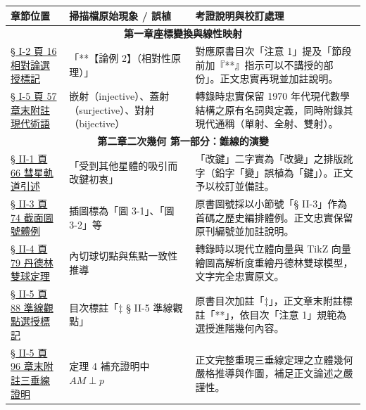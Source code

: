 \documentclass[a4paper,12pt,twoside]{article}
\begin{document}
\begin{table}[H]
\centering
\small
\renewcommand{\arraystretch}{1.35}
\begin{tabularx}{\textwidth}{|p{3.0cm}|p{3.8cm}|X|}
\hline
\textbf{章節位置} & \textbf{掃描檔原始現象 / 誤植} & \textbf{考證說明與校訂處理} \\ \hline

\multicolumn{3}{|c|}{\textbf{第一章\quad 座標變換與線性映射}} \\ \hline

\hyperref[note:b4-ch1-p16-lorentz]{§ I-2 頁 16 相對論選授標記} & 
「**【論例 2】（相對性原理）」 & 
對應原書目次「注意 1」提及「節段前加『**』指示可以不講授的部份」。正文忠實再現並加註說明。 \\ \hline

\hyperref[note:b4-ch1-p57-appendix-note]{§ I-5 頁 57 章末附註現代術語} & 
嵌射（injective）、蓋射（surjective）、對射（bijective） & 
轉錄時忠實保留 1970 年代現代數學結構之原有名詞與定義，同時附錄其現代通稱（單射、全射、雙射）。 \\ \hline

\multicolumn{3}{|c|}{\textbf{第二章\quad 二次幾何 第一部分：錐線的演變}} \\ \hline

\hyperref[sec:b4-2-1]{§ II-1 頁 66 彗星軌道引述} & 
「受到其他星體的吸引而改鍵初衷」 & 
「改鍵」二字實為「改變」之排版訛字（鉛字「變」誤植為「鍵」）。正文予以校訂並備註。 \\ \hline

\hyperref[sec:b4-2-3]{§ II-3 頁 74 截面圖號體例} & 
插圖標為「圖 3-1」、「圖 3-2」等 & 
原書圖號採以小節號「§ II-3」作為首碼之歷史編排體例。正文忠實保留原刊編號並加註說明。 \\ \hline

\hyperref[sec:b4-2-4]{§ II-4 頁 79 丹德林雙球定理} & 
內切球切點與焦點一致性推導 & 
轉錄時以現代立體向量與 TikZ 向量繪圖高解析度重繪丹德林雙球模型，文字完全忠實原文。 \\ \hline

\hyperref[sec:b4-2-5]{§ II-5 頁 88 準線觀點選授標記} & 
目次標註「$\ddagger$ § II-5 準線觀點」 & 
原書目次加註「$\ddagger$」，正文章末附註標註「**」，依目次「注意 1」規範為選授進階幾何內容。 \\ \hline

\hyperref[note:b4-ch2-p96-appendix-note]{§ II-5 頁 96 章末附註三垂線證明} & 
定理 4 補充證明中 $AM \perp p$ & 
正文完整重現三垂線定理之立體幾何嚴格推導與作圖，補足正文論述之嚴謹性。 \\ \hline


\end{tabularx}
\end{table}
\end{document}

